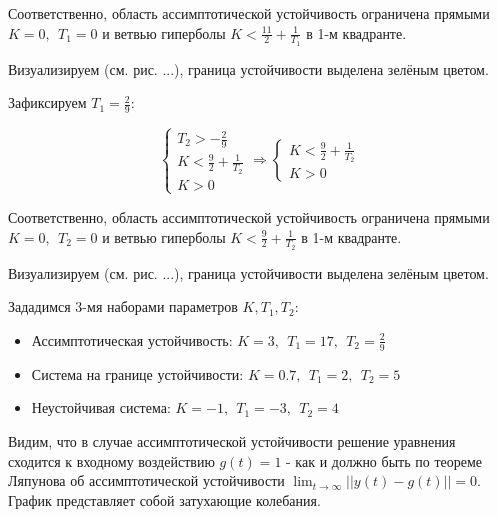 Соответственно, область ассимптотической устойчивость ограничена прямыми $K=0,~~T_1 =0$ и ветвью гиперболы $K<\frac{11}{2}+\frac{1}{T_1 }$ в 1-м квадранте.

Визуализируем (см. рис. ...), граница устойчивости выделена зелёным цветом.


Зафиксируем $T_1 =\frac{2}{9}$:


\begin{par}
$$\left\lbrace \begin{array}{c}
T_2 >-\frac{2}{9}\\
K<\frac{9}{2}+\frac{1}{T_2 }\\
K>0
\end{array}\right.\Rightarrow \left\lbrace \begin{array}{c}
K<\frac{9}{2}+\frac{1}{T_2 }\\
K>0
\end{array}\right.$$
\end{par}

Соответственно, область ассимптотической устойчивость ограничена прямыми $K=0,~~T_2 =0$ и ветвью гиперболы $K<\frac{9}{2}+\frac{1}{T_2 }$ в 1-м квадранте.

Визуализируем (см. рис. ...), граница устойчивости выделена зелёным цветом.



\vspace{1em}
Зададимся 3-мя наборами параметров $K,T_1 ,T_2$:

\begin{itemize}
\setlength{\itemsep}{-1ex}
   \item{\begin{flushleft} Ассимптотическая устойчивость: $K=3,~~T_1 =17,~~T_2 =\frac{2}{9}$ \end{flushleft}}
   \item{\begin{flushleft} Система на границе устойчивости: $K=0.7,~~T_1 =2,~~T_2 =5$ \end{flushleft}}
   \item{\begin{flushleft} Неустойчивая система: $K=-1,~~T_1 =-3,~~T_2 =4$ \end{flushleft}}
\end{itemize}

Видим, что в случае ассимптотической устойчивости решение уравнения сходится к входному воздействию $g(t)=1$ - как и должно быть по теореме Ляпунова об ассимптотической устойчивости $\lim_{t\to \infty } ||y(t)-g(t)||=0$.  График представляет собой затухающие колебания.

